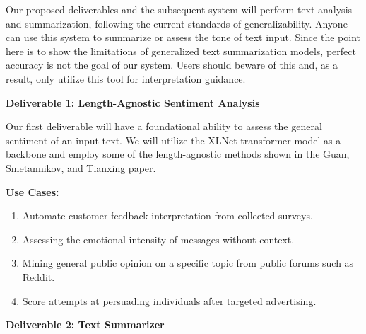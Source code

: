 \vspace{2pt}

Our proposed deliverables and the subsequent system will perform text analysis and summarization, following the current standards of generalizability.
Anyone can use this system to summarize or assess the tone of text input.
Since the point here is to show the limitations of generalized text summarization models, perfect accuracy is not the goal of our system.
Users should beware of this and, as a result, only utilize this tool for interpretation guidance.

\vspace{5pt}

\begin{large}
    \noindent\textbf{Deliverable 1: Length-Agnostic Sentiment Analysis}
\end{large}

Our first deliverable will have a foundational ability to assess the general sentiment of an input text.
We will utilize the XLNet transformer model as a backbone and employ some of the length-agnostic methods shown in the Guan, Smetannikov, and Tianxing paper\cite{Transformers}. 

\vspace{1pt}

\noindent\textbf{Use Cases:}

\vspace{0pt}

\begin{enumerate}[label=\textbf{\arabic*}, labelsep=0.1em, itemsep=0em, topsep=0em, font=\small]
    \item Automate customer feedback interpretation from collected surveys.
    \item Assessing the emotional intensity of messages without context.
    \item Mining general public opinion on a specific topic from public forums such as Reddit.
    \item Score attempts at persuading individuals after targeted advertising.
\end{enumerate}

\vspace{5pt}

\begin{large}
    \noindent\textbf{Deliverable 2: Text Summarizer}
\end{large}

